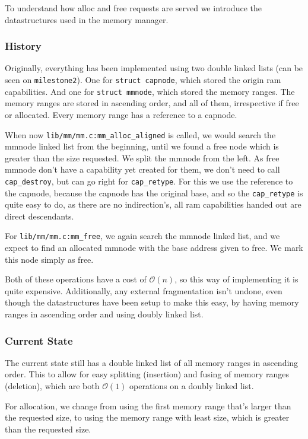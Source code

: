 To understand how alloc and free requests are served we introduce the
datastructures used in the memory manager.

\subsubsection{History}

Originally, everything has been implemented using two double linked lists (can
be seen on \verb|milestone2|).
One for \verb|struct capnode|, which stored the origin ram capabilities.
And one for \verb|struct mmnode|, which stored the memory ranges.
The memory ranges are stored in ascending order, and all of them, irrespective
if free or allocated.
Every memory range has a reference to a capnode.

When now \verb|lib/mm/mm.c:mm_alloc_aligned| is called, we would search the
mmnode linked list from the beginning, until we found a free node which is
greater than the size requested.
We split the mmnode from the left.
As free mmnode don't have a capability yet created for them, we don't need to
call \verb|cap_destroy|, but can go right for \verb|cap_retype|.
For this we use the reference to the capnode, because the capnode has the
original base, and so the \verb|cap_retype| is quite easy to do, as there are
no indirection's, all ram capabilities handed out are direct descendants.

For \verb|lib/mm/mm.c:mm_free|, we again search the mmnode linked list, and we
expect to find an allocated mmnode with the base address given to free.
We mark this node simply as free.

Both of these operations have a cost of $\mathcal{O}(n)$, so this way of
implementing it is quite expensive.
Additionally, any external fragmentation isn't undone, even though the
datastructures have been setup to make this easy, by having memory ranges in
ascending order and using doubly linked list.

\subsubsection{Current State}

The current state still has a double linked list of all memory ranges in
ascending order. This to allow for easy splitting (insertion) and fusing of
memory ranges (deletion), which are both $\mathcal{O}(1)$ operations on a doubly
linked list.

For allocation, we change from using the first memory range that's larger than
the requested size, to using the memory range with least size, which is greater
than the requested size.

